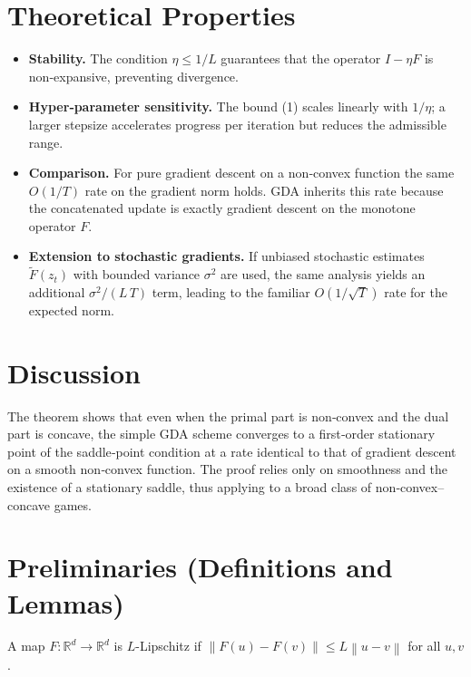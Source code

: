 \documentclass{article}
\newcommand{\norm}[1]{\left\lVert#1\right\rVert}
\begin{document}
\section*{Theoretical Properties}
\begin{itemize}
\item \textbf{Stability.} The condition \(\eta\le 1/L\) guarantees that the operator \(I-\eta F\) is non‑expansive, preventing divergence.
\item \textbf{Hyper‑parameter sensitivity.} The bound (1) scales linearly with \(1/\eta\); a larger stepsize accelerates progress per iteration but reduces the admissible range.
\item \textbf{Comparison.} For pure gradient descent on a non‑convex function the same \(O(1/T)\) rate on the gradient norm holds. GDA inherits this rate because the concatenated update is exactly gradient descent on the monotone operator \(F\).
\item \textbf{Extension to stochastic gradients.} If unbiased stochastic estimates \(\tilde F(z_t)\) with bounded variance \(\sigma^2\) are used, the same analysis yields an additional \(\sigma^2/(L\,T)\) term, leading to the familiar \(O(1/\sqrt{T})\) rate for the expected norm.
\end{itemize}

\section*{Discussion}
The theorem shows that even when the primal part is non‑convex and the dual part is concave, the simple GDA scheme converges to a first‑order stationary point of the saddle‑point condition at a rate identical to that of gradient descent on a smooth non‑convex function. The proof relies only on smoothness and the existence of a stationary saddle, thus applying to a broad class of non‑convex–concave games.

\newpage

\section*{Preliminaries (Definitions and Lemmas)}
\begin{definition}
A map \(F:\mathbb{R}^{d}\to\mathbb{R}^{d}\) is \(L\)-Lipschitz if 
\(\norm{F(u)-F(v)}\le L\norm{u-v}\) for all \(u,v\).
\end{definition}
\end{document}

